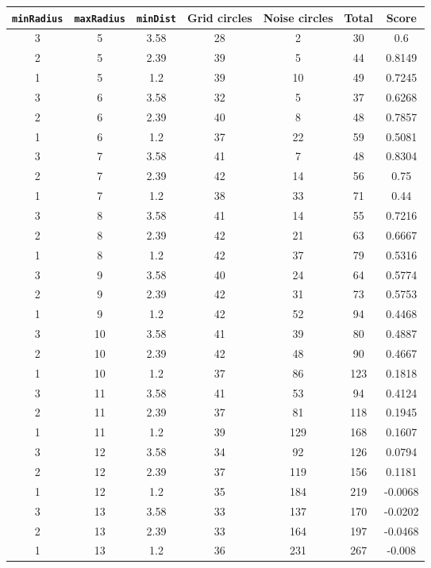 \documentclass[letterpaper, 12pt]{article}
\begin{document}
\begin{longtable}{|c|c|c|c|c|c|c|}
\hline
\textbf{\texttt{minRadius}} & \textbf{\texttt{maxRadius}} & \textbf{\texttt{minDist}} & \textbf{Grid circles} & \textbf{Noise circles} & \textbf{Total} & \textbf{Score} \\
\hline
3 & 5 & 3.58 & 28 & 2 & 30 & 0.6 \\
\hline
2 & 5 & 2.39 & 39 & 5 & 44 & 0.8149 \\
\hline
1 & 5 & 1.2 & 39 & 10 & 49 & 0.7245 \\
\hline
3 & 6 & 3.58 & 32 & 5 & 37 & 0.6268 \\
\hline
2 & 6 & 2.39 & 40 & 8 & 48 & 0.7857 \\
\hline
1 & 6 & 1.2 & 37 & 22 & 59 & 0.5081 \\
\hline
3 & 7 & 3.58 & 41 & 7 & 48 & 0.8304 \\
\hline
2 & 7 & 2.39 & 42 & 14 & 56 & 0.75 \\
\hline
1 & 7 & 1.2 & 38 & 33 & 71 & 0.44 \\
\hline
3 & 8 & 3.58 & 41 & 14 & 55 & 0.7216 \\
\hline
2 & 8 & 2.39 & 42 & 21 & 63 & 0.6667 \\
\hline
1 & 8 & 1.2 & 42 & 37 & 79 & 0.5316 \\
\hline
3 & 9 & 3.58 & 40 & 24 & 64 & 0.5774 \\
\hline
2 & 9 & 2.39 & 42 & 31 & 73 & 0.5753 \\
\hline
1 & 9 & 1.2 & 42 & 52 & 94 & 0.4468 \\
\hline
3 & 10 & 3.58 & 41 & 39 & 80 & 0.4887 \\
\hline
2 & 10 & 2.39 & 42 & 48 & 90 & 0.4667 \\
\hline
1 & 10 & 1.2 & 37 & 86 & 123 & 0.1818 \\
\hline
3 & 11 & 3.58 & 41 & 53 & 94 & 0.4124 \\
\hline
2 & 11 & 2.39 & 37 & 81 & 118 & 0.1945 \\
\hline
1 & 11 & 1.2 & 39 & 129 & 168 & 0.1607 \\
\hline
3 & 12 & 3.58 & 34 & 92 & 126 & 0.0794 \\
\hline
2 & 12 & 2.39 & 37 & 119 & 156 & 0.1181 \\
\hline
1 & 12 & 1.2 & 35 & 184 & 219 & -0.0068 \\
\hline
3 & 13 & 3.58 & 33 & 137 & 170 & -0.0202 \\
\hline
2 & 13 & 2.39 & 33 & 164 & 197 & -0.0468 \\
\hline
1 & 13 & 1.2 & 36 & 231 & 267 & -0.008 \\

\end{longtable}
\end{document}
